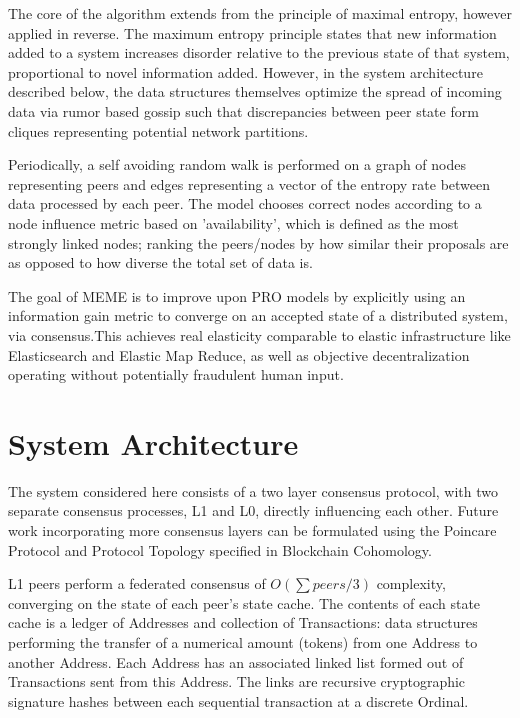 \documentclass{article}
\begin{document}
The core of the algorithm extends from the principle of maximal entropy, however applied in reverse. The maximum entropy principle states that new information added to a system increases disorder relative to the previous state of that system, proportional to novel information added. However, in the system architecture described below, the data structures themselves optimize the spread of incoming data via rumor based gossip such that discrepancies between peer state form cliques representing potential network partitions.

Periodically, a self avoiding random walk is performed on a graph of nodes representing peers and edges representing a vector of the entropy rate between data processed by each peer. The model chooses correct nodes according to a node influence metric based on 'availability', which is defined as the most strongly linked nodes; ranking the peers/nodes by how similar their proposals are as opposed to how diverse the total set of data is.

The goal of MEME is to improve upon PRO models by explicitly using an information gain metric to converge on an accepted state of a distributed system, via consensus.This achieves real elasticity comparable to elastic infrastructure like Elasticsearch and Elastic Map Reduce, as well as objective decentralization operating without potentially fraudulent human input.

\section{System Architecture}
The system considered here consists of a two layer consensus protocol, with two separate consensus processes, L1 and L0, directly influencing each other. Future work incorporating more consensus layers can be formulated using the Poincare Protocol and Protocol Topology specified in Blockchain Cohomology.

L1 peers perform a federated consensus of $O(\sum peers/3)$ complexity, converging on the state of each peer’s state cache. The contents of each state cache is a ledger of Addresses and collection of Transactions: data structures performing the transfer of a numerical amount (tokens) from one Address to another Address. Each Address has an associated linked list formed out of Transactions sent from this Address. The links are recursive cryptographic signature hashes between each sequential transaction at a discrete Ordinal.
\end{document}
